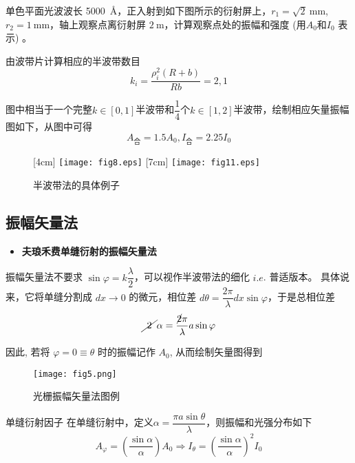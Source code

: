 \begin{example}
	单色平面光波波长 \qty{5000}{\angstrom}，正入射到如下图所示的衍射屏上，$r_1=\sqrt{2} \mathrm{~mm}$, $r_2=1 \mathrm{~mm}$，轴上观察点离衍射屏 $2 \mathrm{~m}$，计算观察点处的振幅和强度 (用$A_0$和$I_{0}$ 表示) 。
	\soln

	
	\par 由波带片计算相应的半波带数目
	\[
		k_{i}=\dfrac{\rho_i^2(R+b)}{Rb}=2,1	
	\]
	\par 图中相当于一个完整$k\in[0,1]$半波带和$\dfrac{1}{4}$个$k\in[1,2]$半波带，绘制相应矢量振幅图如下，从图中可得
	\[
		A_{合}=1.5A_0,I_{合}=2.25I_0	
	\]
\end{example}

\begin{figure}[!htp]
	\centering
	[4cm]
	{\texttt{[image: fig8.eps]}}
	\hspace{1cm}
	[7cm]
	{\texttt{[image: fig11.eps]}}
	\caption{半波带法的具体例子}
\end{figure}

\subsection{振幅矢量法}
\begin{itemize}
	\item \textbf{夫琅禾费单缝衍射的振幅矢量法}
\end{itemize}
\par 振幅矢量法不要求 $\sin \varphi=k \dfrac{\lambda}{2}$，可以视作半波带法的细化 $i . e$. 普适版本。 具体说来，它将单缝分割成 $d x \rightarrow 0$ 的微元，相位差 $d \theta=\dfrac{2 \pi}{\lambda} d x \sin \varphi$，于是总相位差
\[
	\cancel{\begin{array}{c}
		2\\
	\end{array}}\alpha =\frac{\cancel{2}\pi}{\lambda}a\sin \varphi 
\]
\par 因此, 若将 $\varphi=0 \equiv \theta$ 时的振幅记作 $A_0$, 从而绘制矢量图得到
\begin{figure}[!htp]
	\centering
	\texttt{[image: fig5.png]}
	\caption{光栅振幅矢量法图例}
\end{figure}
\begin{myprop}{ 单缝衍射因子}{}
	在单缝衍射中，定义$\alpha=\dfrac{\pi a\sin \theta}{\lambda}$，则振幅和光强分布如下
	\[
		A_{\varphi}=\left(\frac{\sin \alpha}{\alpha}\right) A_0 \Rightarrow I_{\theta}=\left(\frac{\sin \alpha}{\alpha}\right)^2 I_0
	\]
\end{myprop}

